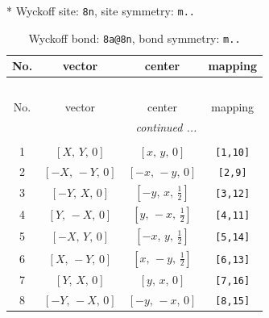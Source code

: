 \documentclass[fleqn,8pt]{jsarticle}
\begin{document}
* Wyckoff site: {\tt 8n}, site symmetry: {\tt m..}
\renewcommand{\arraystretch}{1.2}
\begin{longtable}{cccc}
\caption{Wyckoff bond: {\tt 8a@8n}, bond symmetry: {\tt m..}}
 \\
 \hline \hline
No. & vector & center & mapping \\ \hline \endfirsthead

\multicolumn{3}{l}{\tablename\ \thetable{}} \\
 \hline \hline
No. & vector & center & mapping \\ \hline \endhead

 \hline \hline
\multicolumn{3}{r}{\footnotesize\it continued ...} \\ \endfoot

 \hline \hline
\multicolumn{3}{r}{} \\ \endlastfoot

1 & $\left[ X,\, Y,\, 0 \right]$ & $\left[ x,\, y,\, 0 \right]$ & {\tt [1,10]} \\ \hline
2 & $\left[ - X,\, - Y,\, 0 \right]$ & $\left[ - x,\, - y,\, 0 \right]$ & {\tt [2,9]} \\ \hline
3 & $\left[ - Y,\, X,\, 0 \right]$ & $\left[ - y,\, x,\, \frac{1}{2} \right]$ & {\tt [3,12]} \\ \hline
4 & $\left[ Y,\, - X,\, 0 \right]$ & $\left[ y,\, - x,\, \frac{1}{2} \right]$ & {\tt [4,11]} \\ \hline
5 & $\left[ - X,\, Y,\, 0 \right]$ & $\left[ - x,\, y,\, \frac{1}{2} \right]$ & {\tt [5,14]} \\ \hline
6 & $\left[ X,\, - Y,\, 0 \right]$ & $\left[ x,\, - y,\, \frac{1}{2} \right]$ & {\tt [6,13]} \\ \hline
7 & $\left[ Y,\, X,\, 0 \right]$ & $\left[ y,\, x,\, 0 \right]$ & {\tt [7,16]} \\ \hline
8 & $\left[ - Y,\, - X,\, 0 \right]$ & $\left[ - y,\, - x,\, 0 \right]$ & {\tt [8,15]} \\
\end{longtable}
\renewcommand{\arraystretch}{1.2}
\end{document}
